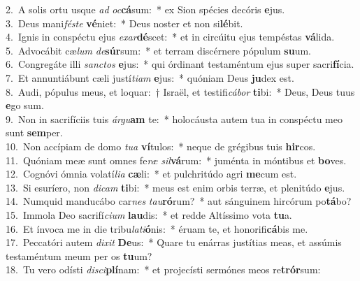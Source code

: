 {2.~}A solis ortu usque \textit{ad} \textit{oc}\textbf{cá}sum:~* ex Sion spécies decóris \textbf{e}jus.\\
{3.~}Deus mani\textit{fé}\textit{ste} \textbf{vé}niet:~* Deus noster et non si\textbf{lé}bit.\\
{4.~}Ignis in conspéctu ejus \textit{e}\textit{xar}\textbf{dé}scet:~* et in circúitu ejus tempéstas \textbf{vá}lida.\\
{5.~}Advocábit cæ\textit{lum} \textit{de}\textbf{súr}sum:~* et terram discérnere pópulum \textbf{su}um.\\
{6.~}Congregáte illi \textit{san}\textit{ctos} \textbf{e}jus:~* qui órdinant testaméntum ejus super sacri\textbf{fí}cia.\\
{7.~}Et annuntiábunt cæli justí\textit{ti}\textit{am} \textbf{e}jus:~* quóniam Deus \textbf{ju}dex est.\\
{8.~}Audi, pópulus meus, et loquar:~† Israël, et testifi\textit{cá}\textit{bor} \textbf{ti}bi:~* Deus, Deus tuus \textbf{e}go sum.\\
{9.~}Non in sacrifíciis tuis \textit{ár}\textit{gu}\textbf{am} te:~* holocáusta autem tua in conspéctu meo sunt \textbf{sem}per.\\
{10.~}Non accípiam de domo \textit{tu}\textit{a} \textbf{ví}tulos:~* neque de grégibus tuis \textbf{hir}cos.\\
{11.~}Quóniam meæ sunt omnes fe\textit{ræ} \textit{sil}\textbf{vá}rum:~* juménta in móntibus et \textbf{bo}ves.\\
{12.~}Cognóvi ómnia volatí\textit{li}\textit{a} \textbf{cæ}li:~* et pulchritúdo agri \textbf{me}cum est.\\
{13.~}Si esuríero, non \textit{di}\textit{cam} \textbf{ti}bi:~* meus est enim orbis terræ, et plenitúdo \textbf{e}jus.\\
{14.~}Numquid manducábo car\textit{nes} \textit{tau}\textbf{ró}rum?~* aut sánguinem hircórum po\textbf{tá}bo?\\
{15.~}Immola Deo sacrifí\textit{ci}\textit{um} \textbf{lau}dis:~* et redde Altíssimo vota \textbf{tu}a.\\
{16.~}Et ínvoca me in die tribu\textit{la}\textit{ti}\textbf{ó}nis:~* éruam te, et honorifi\textbf{cá}bis me.\\
{17.~}Peccatóri autem \textit{di}\textit{xit} \textbf{De}us:~* Quare tu enárras justítias meas, et assúmis testaméntum meum per os \textbf{tu}um?\\
{18.~}Tu vero odísti \textit{di}\textit{sci}\textbf{plí}nam:~* et projecísti sermónes meos re\textbf{trór}sum:\\
